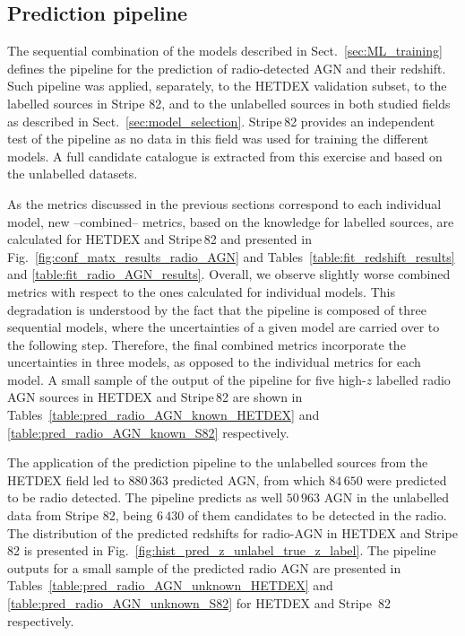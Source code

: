 \documentclass{aa}
\begin{document}
\subsection{Prediction pipeline}\label{sec:results_prediction_pipeline}


The sequential combination of the models described in Sect.~\ref{sec:ML_training} defines the pipeline for the prediction of radio-detected AGN and their redshift. Such pipeline was applied, separately, to the HETDEX validation subset, to the labelled sources in Stripe 82, and to the unlabelled sources in both studied fields as described in Sect.~\ref{sec:model_selection}.  Stripe\,82 provides an independent test of the pipeline as no data in this field was used for training the different models. A full candidate catalogue is extracted from this exercise and based on the unlabelled datasets.

As the metrics discussed in the previous sections correspond to each individual model, new --combined-- metrics, based on the knowledge for labelled sources, are calculated for HETDEX and Stripe\,82 and presented in Fig.~\ref{fig:conf_matx_results_radio_AGN} and Tables~\ref{table:fit_redshift_results} and \ref{table:fit_radio_AGN_results}. 
Overall, we observe slightly worse combined metrics  with respect to the ones calculated for individual models. This degradation is understood by the fact that the pipeline is composed of three sequential models, where the uncertainties of a given model are carried over to the following step. Therefore, the final combined metrics incorporate the uncertainties in three models, as opposed to the individual metrics for each model.
A small sample of the output of the pipeline for five high-$z$ labelled radio AGN sources in HETDEX and Stripe\,82 are shown in Tables~\ref{table:pred_radio_AGN_known_HETDEX} and \ref{table:pred_radio_AGN_known_S82} respectively.

The application of the prediction pipeline to the unlabelled sources from the HETDEX field led to $880\,363$ predicted AGN, from which $84\,650$ were predicted to be radio detected. The pipeline predicts as well $50\,963$ AGN in the unlabelled data from Stripe 82, being $6\,430$ of them candidates to be detected in the radio. 
The distribution of the predicted redshifts for radio-AGN in HETDEX and Stripe 82 is presented in  Fig.~\ref{fig:hist_pred_z_unlabel_true_z_label}. The pipeline outputs for a small sample of the predicted radio AGN are presented in Tables~\ref{table:pred_radio_AGN_unknown_HETDEX} and \ref{table:pred_radio_AGN_unknown_S82} for HETDEX and Stripe\, 82 respectively.
\end{document}
